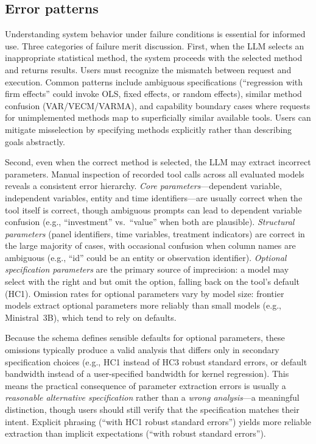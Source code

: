 \subsection{Error patterns}

Understanding system behavior under failure conditions is essential for
informed use. Three categories of failure merit discussion. First,
when the LLM selects an inappropriate statistical method, the system
proceeds with the selected method and returns results. Users must
recognize the mismatch between request and execution. Common patterns
include ambiguous specifications (``regression with firm effects'' could
invoke OLS, fixed effects, or random effects), similar method confusion
(VAR/VECM/VARMA), and capability boundary cases where requests for
unimplemented methods map to superficially similar available tools.
Users can mitigate misselection by specifying methods explicitly
rather than describing goals abstractly.


Second, even when the correct method is selected, the LLM may extract
incorrect parameters. Manual inspection of recorded tool calls across
all evaluated models reveals a consistent error hierarchy.
\emph{Core parameters}---dependent variable, independent variables,
entity and time identifiers---are usually correct when the tool
itself is correct, though ambiguous prompts can lead to dependent
variable confusion (e.g., ``investment'' vs.\ ``value'' when both are
plausible).  \emph{Structural parameters}
(panel identifiers, time variables, treatment indicators) are correct
in the large majority of cases, with occasional confusion when
column names are ambiguous (e.g., ``id'' could be an entity or
observation identifier).  \emph{Optional specification parameters}
are the primary source of imprecision: a model may select
 with the right  and
 but omit the  option, falling back on
the tool's default (HC1).  Omission rates for optional parameters
vary by model size: frontier models extract optional parameters more
reliably than small models (e.g., Ministral~3B), which tend to rely on
defaults.

Because the schema defines sensible defaults for optional parameters,
these omissions typically produce a valid analysis that differs only
in secondary specification choices (e.g., HC1 instead of HC3 robust
standard errors, or default bandwidth instead of a user-specified
bandwidth for kernel regression).  This means the practical
consequence of parameter extraction errors is usually a
\emph{reasonable alternative specification} rather than a
\emph{wrong analysis}---a meaningful distinction, though users
should still verify that the specification matches their intent.
Explicit phrasing (``with HC1 robust standard errors'') yields
more reliable extraction than implicit expectations (``with robust
standard errors'').

